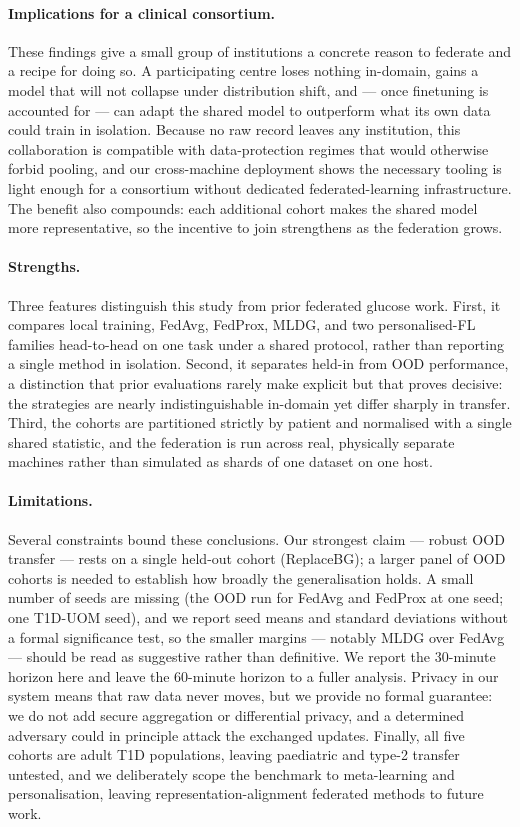 \documentclass[10pt,letterpaper]{article}
\begin{document}
\paragraph{Implications for a clinical consortium.} These findings give a small
group of institutions a concrete reason to federate and a recipe for doing so.
A participating centre loses nothing in-domain, gains a model that will not
collapse under distribution shift, and --- once finetuning is accounted for ---
can adapt the shared model to outperform what its own data could train in
isolation. Because no raw record leaves any institution, this collaboration is
compatible with data-protection regimes that would otherwise forbid pooling, and
our cross-machine deployment shows the necessary tooling is light enough for a
consortium without dedicated federated-learning infrastructure. The benefit also
compounds: each additional cohort makes the shared model more representative, so
the incentive to join strengthens as the federation grows.

\paragraph{Strengths.} Three features distinguish this study from prior federated
glucose work. First, it compares local training, FedAvg, FedProx, MLDG, and two
personalised-FL families head-to-head on one task under a shared protocol, rather
than reporting a single method in isolation. Second, it separates held-in from
OOD performance, a distinction that prior evaluations rarely make explicit but
that proves decisive: the strategies are nearly indistinguishable in-domain yet
differ sharply in transfer. Third, the cohorts are partitioned strictly by
patient and normalised with a single shared statistic, and the federation is run
across real, physically separate machines rather than simulated as shards of one
dataset on one host.

\paragraph{Limitations.} Several constraints bound these conclusions. Our
strongest claim --- robust OOD transfer --- rests on a single held-out cohort
(ReplaceBG); a larger panel of OOD cohorts is needed to establish how broadly the
generalisation holds. A small number of seeds are missing (the OOD run for FedAvg
and FedProx at one seed; one T1D-UOM seed), and we report seed means and standard
deviations without a formal significance test, so the smaller margins --- notably
MLDG over FedAvg --- should be read as suggestive rather than definitive. We
report the 30-minute horizon here and leave the 60-minute horizon to a fuller
analysis. Privacy in our system means that raw data never moves, but we provide no
formal guarantee: we do not add secure aggregation or differential privacy, and a
determined adversary could in principle attack the exchanged updates. Finally, all
five cohorts are adult T1D populations, leaving paediatric and type-2 transfer
untested, and we deliberately scope the benchmark to meta-learning and
personalisation, leaving representation-alignment federated methods to future
work.
\end{document}
